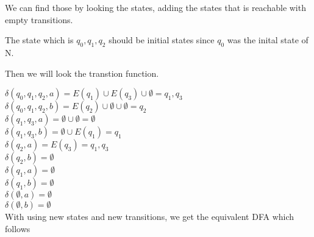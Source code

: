 \documentclass[12pt]{article}
\begin{document}
We can find those by looking the states, adding the states that is reachable with empty transitions.

The state which is ${q_0,q_1,q_2}$ should be initial states since  $q_0$ was the inital state of N.

Then we will look the transtion function.

$\delta({q_0,q_1,q_2},a) = E(q_1) \cup E(q_3) \cup \emptyset= {q_1, q_3}$ \\
$\delta({q_0,q_1,q_2}, b) = E(q_2) \cup \emptyset \cup \emptyset = {q_2}$ \\

$\delta({q_1,q_3},a) = \emptyset \cup \emptyset = \emptyset$ \\
$\delta({q_1, q_3},b) = \emptyset \cup E(q_1) = {q_1}$ \\

$\delta({q_2},a) = E(q_3) = {q_1, q_3}$ \\
$\delta({q_2},b) = \emptyset$ \\

$\delta({q_1}, a) = \emptyset $ \\
$\delta({q_1},b) = \emptyset$ \\

$\delta(\emptyset, a) = \emptyset$ \\
$\delta(\emptyset, b) = \emptyset$ \\

With using new states and new transitions, we get the equivalent DFA which follows
\end{document}
